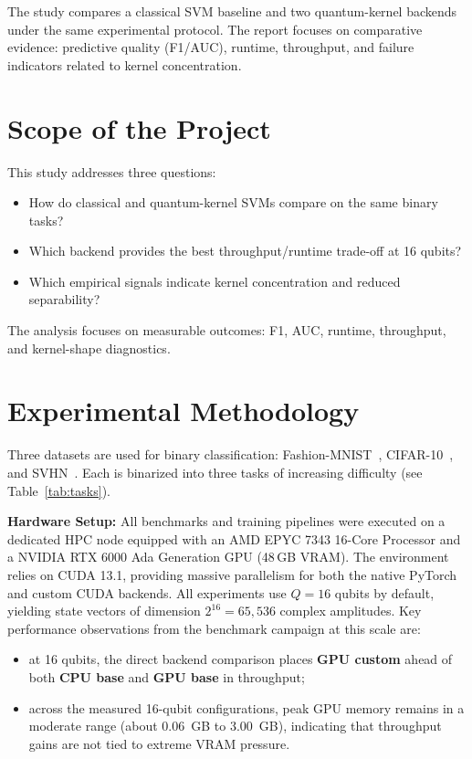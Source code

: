 \documentclass[10pt,twocolumn,letterpaper]{article}
\begin{document}
The study compares a classical SVM baseline and two quantum-kernel backends under the same experimental protocol. 
The report focuses on comparative evidence: predictive quality (F1/AUC), runtime, throughput, 
and failure indicators related to kernel concentration.

\section{Scope of the Project}
This study addresses three questions:
\begin{itemize}
    \item How do classical and quantum-kernel SVMs compare on the same binary tasks?
    \item Which backend provides the best throughput/runtime trade-off at 16 qubits?
    \item Which empirical signals indicate kernel concentration and reduced separability?
\end{itemize}

The analysis focuses on measurable outcomes: F1, AUC, runtime, throughput, and kernel-shape diagnostics.

\section{Experimental Methodology}
Three datasets are used for binary classification: Fashion-MNIST~\cite{xiao2017fashion}, 
CIFAR-10~\cite{krizhevsky2009cifar}, and SVHN~\cite{netzer2011svhn}. 
Each is binarized into three tasks of increasing difficulty (see Table~\ref{tab:tasks}).

\textbf{Hardware Setup:} All benchmarks and training pipelines were executed on a dedicated HPC node equipped 
with an AMD EPYC 7343 16-Core Processor and a NVIDIA RTX 6000 Ada Generation GPU (48\,GB VRAM). The environment 
relies on CUDA 13.1, providing massive parallelism for both the native PyTorch and custom CUDA backends.
All experiments use $Q=16$ qubits by default, yielding state vectors of dimension $2^{16} = 65{,}536$ 
complex amplitudes. Key performance observations from the benchmark campaign at this scale are:
\begin{itemize}
    \item at 16 qubits, the direct backend comparison places \textbf{GPU custom} ahead of both \textbf{CPU base} 
    and \textbf{GPU base} in throughput;
    \item across the measured 16-qubit configurations, peak GPU memory remains in a moderate range
     (about \SI{0.06}{GB} to \SI{3.00}{GB}), indicating that throughput gains are not tied to extreme VRAM pressure.
\end{itemize}
\end{document}
